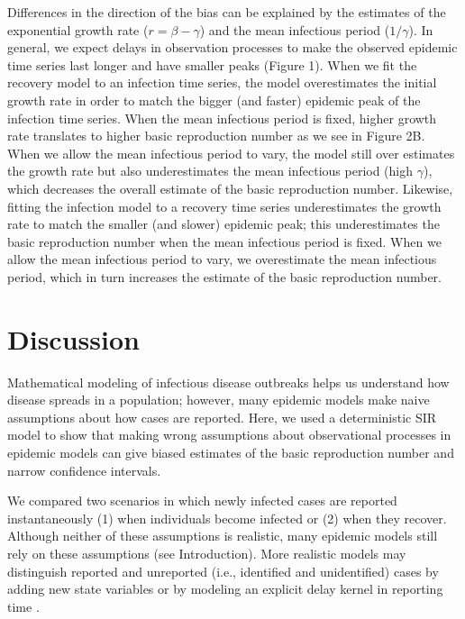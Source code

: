 \documentclass[12pt]{article}\usepackage[]{graphicx}\usepackage[]{color}
\begin{document}
Differences in the direction of the bias can be explained by the estimates of the
exponential growth rate ($r = \beta - \gamma$) and the mean infectious period ($1/\gamma$).
In general, we expect delays in observation processes to make the observed epidemic 
time series last longer and have smaller peaks (Figure 1).
When we fit the recovery model to an infection time series, the model overestimates
the initial growth rate in order to match the bigger (and faster) epidemic peak of the 
infection time series. When the mean infectious period is fixed, higher growth rate
translates to higher basic reproduction number as we see in Figure 2B. When we allow
the mean infectious period to vary, the model still over estimates the growth rate but
also underestimates the mean infectious period (high $\gamma$), 
which decreases the overall estimate of the basic reproduction number.
Likewise, fitting the infection model to a recovery time series underestimates
the growth rate to match the smaller (and slower) epidemic peak; this 
underestimates the basic reproduction number when the mean infectious period is fixed. 
When we allow the mean infectious period to vary, we overestimate the mean infectious
period, which in turn increases the estimate of the basic reproduction number.

\section{Discussion}

Mathematical modeling of infectious disease outbreaks helps us understand 
how disease spreads in a population; however, many epidemic models make 
naive assumptions about how cases are reported. 
Here, we used a deterministic SIR model to show that 
making wrong assumptions about observational processes in epidemic models
can give biased estimates of the basic reproduction number and narrow
confidence intervals.

We compared two scenarios in which newly infected cases are reported 
instantaneously (1) when individuals become infected or
(2) when they recover. Although neither of these
assumptions is realistic, many epidemic models still rely on these
assumptions (see Introduction). 
More realistic models may distinguish reported and unreported
(i.e., identified and unidentified) cases by adding
new state variables \citep{browne2015modeling,webb2015model} 
or by modeling an explicit delay kernel in reporting time 
\citep{harris1990reporting, ferguson2001foot, ster2009epidemiological, 
birrell2011bayesian, funk2018real}.
\end{document}

